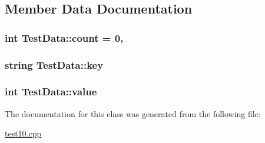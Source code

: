 \subsection{Member Data Documentation}
\hypertarget{class_test_data_a9209c5345dda5dcb483b9c972fafc495}{
\subsubsection[{count}]{\setlength{\rightskip}{0pt plus 5cm}int Test\+Data\+::count = 0\hspace{0.3cm}{\ttfamily [static]}, {\ttfamily [private]}}}\label{class_test_data_a9209c5345dda5dcb483b9c972fafc495}
\hypertarget{class_test_data_a16fe3a9a89c54e55fc56ae88590ae0c8}{
\subsubsection[{key}]{\setlength{\rightskip}{0pt plus 5cm}string Test\+Data\+::key\hspace{0.3cm}{\ttfamily [private]}}}\label{class_test_data_a16fe3a9a89c54e55fc56ae88590ae0c8}
\hypertarget{class_test_data_a8291f6b900b25a926deb1b2a393dc0ff}{
\subsubsection[{value}]{\setlength{\rightskip}{0pt plus 5cm}int Test\+Data\+::value\hspace{0.3cm}{\ttfamily [private]}}}\label{class_test_data_a8291f6b900b25a926deb1b2a393dc0ff}


The documentation for this class was generated from the following file\+:\begin{DoxyCompactItemize}
\item 
\hyperlink{test10_8cpp}{test10.\+cpp}\end{DoxyCompactItemize}
